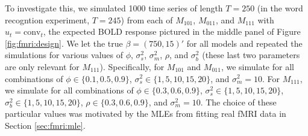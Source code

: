 To investigate this, we simulated 1000 time series of length $T = 250$ (in the word recogntion experiment, $T = 245$) from each of $M_{101}$, $M_{011}$, and $M_{111}$ with $u_t = \mbox{conv}_t$, the expected BOLD response pictured in the middle panel of Figure \ref{fig:fmri:design}. We let the true $\beta = (750, 15)'$ for all models and repeated the simulations for various values of $\phi$, $\sigma^2_s$, $\sigma^2_m$, $\rho$, and $\sigma^2_b$ (these last two parameters are only relevant for $M_{111}$). Specifically, for $M_{101}$ and $M_{011}$, we simulate for all combinations of $\phi \in \{0.1, 0.5, 0.9\}$, $\sigma^2_s \in \{1, 5, 10, 15, 20\}$, and $\sigma^2_m = 10$. For $M_{111}$, we simulate for all combinations of $\phi \in \{0.3, 0.6, 0.9\}$, $\sigma^2_s \in \{1, 5, 10, 15, 20\}$, $\sigma^2_b \in \{1, 5, 10, 15, 20\}$, $\rho \in \{0.3, 0.6, 0.9\}$, and $\sigma^2_m = 10$. The choice of these particular values was motivated by the MLEs from fitting real fMRI data in Section \ref{sec:fmri:mle}.

